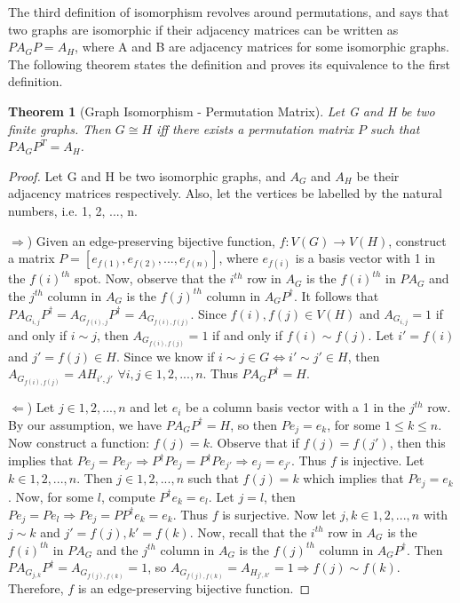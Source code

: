 \documentclass[12pt]{article}
\newtheorem{thm}{Theorem}[section]
\begin{document}
The third definition of isomorphism revolves around permutations, and says that two graphs are isomorphic if their adjacency matrices can be written as $PA_GP = A_H$, where A and B are adjacency matrices for some isomorphic graphs. The following theorem states the definition and proves its equivalence to the first definition.

\begin{thm}[Graph Isomorphism - Permutation Matrix]
\label{permutation}
Let G and H be two finite graphs. Then $G \cong H$ iff there exists a permutation matrix $P$ such that $PA_GP^T = A_H$.
\end{thm}

\begin{proof}
Let G and H be two isomorphic graphs, and $A_G$ and $A_H$ be their adjacency matrices respectively. Also, let the vertices be labelled by the natural numbers, i.e. 1, 2, ..., n.

$\Rightarrow$) Given an edge-preserving bijective function, $f:V(G) \to V(H)$, construct a matrix $P = [e_{f(1)}, e_{f(2)}, ..., e_{f(n)}]$, where $e_{f(i)}$ is a basis vector with 1 in the $f(i)^{th}$ spot. Now, observe that the $i^{th}$ row in $A_G$ is the $f(i)^{th}$ in $PA_G$ and the $j^{th}$ column in $A_G$ is the $f(j)^{th}$ column in $A_GP^{\dag}$. It follows that $PA_{G_{i, j}}P^{\dag} = A_{G_{f(i), j}}P^{\dag} = A_{G_{f(i), f(j)}}$. Since $f(i), f(j) \in V(H)$ and $A_{G_{i, j}} = 1$ if and only if $i \sim j$, then $A_{G_{f(i), f(j)}} = 1$ if and only if $f(i) \sim f(j)$. Let $i' = f(i)$ and $j' = f(j) \in H$. Since we know if $i \sim j \in G \Leftrightarrow i' \sim j' \in H$, then $A_{G_{f(i), f(j)}} = A{H_{i', j'}}$ $\forall i, j \in 1, 2, ..., n$. Thus $PA_GP^{\dag} = H$.

$\Leftarrow$) Let $j \in 1, 2, ..., n$ and let $e_i$ be a column basis vector with a 1 in the $j^{th}$ row. By our assumption, we have $PA_GP^{\dag} = H$, so then $Pe_j = e_k$, for some $1 \leq k \leq n$. Now construct a function: $f(j) = k$. Observe that if $f(j) = f(j')$, then this implies that $Pe_j = Pe_{j'} \Rightarrow P^{\dag}Pe_j = P^{\dag}Pe_{j'} \Rightarrow e_j = e_{j'}$. Thus $f$ is injective. Let $k \in 1, 2, ..., n$. Then $j \in 1, 2, ..., n$ such that $f(j) = k$ which implies that $Pe_j = e_k$. Now, for some $l$, compute $P^{\dag}e_k = e_l$. Let $j = l$, then $Pe_j = Pe_l \Rightarrow Pe_j = PP^{\dag}e_k = e_k$. Thus $f$ is surjective. Now let $j, k \in 1, 2, ..., n$ with $j \sim k$ and $j' = f(j), k' = f(k)$. Now, recall that the $i^{th}$ row in $A_G$ is the $f(i)^{th}$ in $PA_G$ and the $j^{th}$ column in $A_G$ is the $f(j)^{th}$ column in $A_GP^{\dag}$. Then $PA_{G_{j, k}}P^{\dag} = A_{G_{f(j), f(k)}} = 1$, so $A_{G_{f(j), f(k)}} = A_{H_{j', k'}} = 1 \Rightarrow f(j) \sim f(k)$. Therefore, $f$ is an edge-preserving bijective function.

\end{proof}
\end{document}
